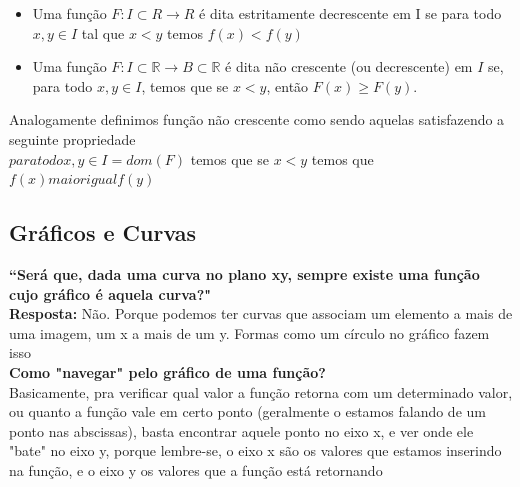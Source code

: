 \documentclass{article}
\begin{document}
\begin{itemize}
    \item Uma função $F: I \subset R \xrightarrow{} R$ é dita estritamente decrescente em I se para todo $x, y \in I$ tal que $x < y$ temos $f(x) < f(y)$
    
    \item Uma função $F: I \subset \mathbb{R} \to B \subset \mathbb{R}$ é dita não crescente (ou decrescente) em $I$ se, para todo $x, y \in I$, temos que se $x < y$, então $F(x) \geq F(y)$.
\end{itemize}

Analogamente definimos função não crescente como sendo aquelas satisfazendo a seguinte propriedade
\\[5pt]
$para todox, y \in I = dom(F)$ temos que se $x < y$ temos que $f(x) maiorigual f(y)$

\subsection{Gráficos e Curvas}
\textbf{``Será que, dada uma curva no plano xy, sempre existe uma função cujo gráfico é aquela curva?"}
\\[5pt]
\textbf{Resposta:} Não. Porque podemos ter curvas que associam um elemento a mais de uma imagem, um x a mais de um y. Formas como um círculo no gráfico fazem isso
\\[10pt]
\textbf{Como "navegar" pelo gráfico de uma função?}
\\[5pt]
Basicamente, pra verificar qual valor a função retorna com um determinado valor, ou quanto a função vale em certo ponto (geralmente o estamos falando de um ponto nas abscissas), basta encontrar aquele ponto no eixo x, e ver onde ele "bate" no eixo y, porque lembre-se, o eixo x são os valores que estamos inserindo na função, e o eixo y os valores que a função está retornando 
\end{document}
